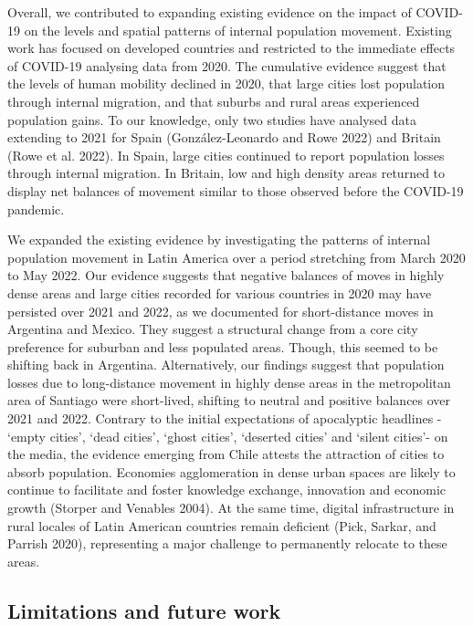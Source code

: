 \documentclass[
  11pt,
]{article}
\begin{document}
Overall, we contributed to expanding existing evidence on the impact of
COVID-19 on the levels and spatial patterns of internal population
movement. Existing work has focused on developed countries and
restricted to the immediate effects of COVID-19 analysing data from
2020. The cumulative evidence suggest that the levels of human mobility
declined in 2020, that large cities lost population through internal
migration, and that suburbs and rural areas experienced population
gains. To our knowledge, only two studies have analysed data extending
to 2021 for Spain (González-Leonardo and Rowe 2022) and Britain (Rowe et
al. 2022). In Spain, large cities continued to report population losses
through internal migration. In Britain, low and high density areas
returned to display net balances of movement similar to those observed
before the COVID-19 pandemic.

We expanded the existing evidence by investigating the patterns of
internal population movement in Latin America over a period stretching
from March 2020 to May 2022. Our evidence suggests that negative
balances of moves in highly dense areas and large cities recorded for
various countries in 2020 may have persisted over 2021 and 2022, as we
documented for short-distance moves in Argentina and Mexico. They
suggest a structural change from a core city preference for suburban and
less populated areas. Though, this seemed to be shifting back in
Argentina. Alternatively, our findings suggest that population losses
due to long-distance movement in highly dense areas in the metropolitan
area of Santiago were short-lived, shifting to neutral and positive
balances over 2021 and 2022. Contrary to the initial expectations of
apocalyptic headlines - `empty cities', `dead cities', `ghost cities',
`deserted cities' and `silent cities'- on the media, the evidence
emerging from Chile attests the attraction of cities to absorb
population. Economies agglomeration in dense urban spaces are likely to
continue to facilitate and foster knowledge exchange, innovation and
economic growth (Storper and Venables 2004). At the same time, digital
infrastructure in rural locales of Latin American countries remain
deficient (Pick, Sarkar, and Parrish 2020), representing a major
challenge to permanently relocate to these areas.

\hypertarget{limitations-and-future-work}{%
\subsection{Limitations and future
work}\label{limitations-and-future-work}}
\end{document}
